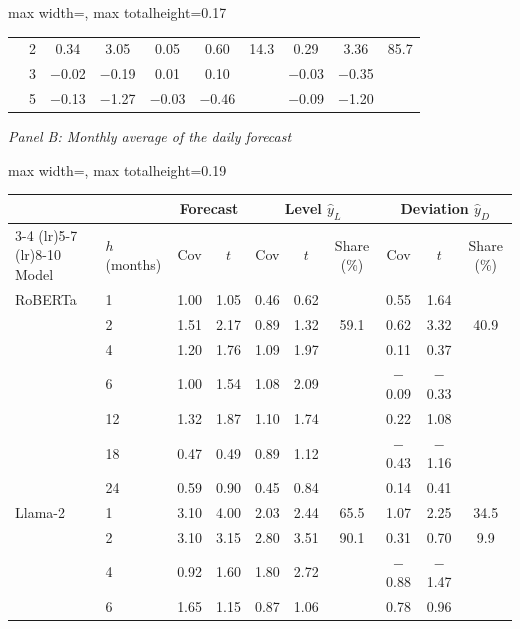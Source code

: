 \begin{table}[htbp]
{\begin{adjustbox}{max width=\linewidth, max totalheight=0.17\textheight}
\begin{tabular}{llcccccccc}
 & 2 & \phantom{$-$}0.34 & \phantom{$-$0}3.05 & \phantom{$-$}0.05 & \phantom{$-$}0.60 & \phantom{$-$}14.3 & \phantom{$-$}0.29 & \phantom{$-$0}3.36 & \phantom{0}85.7 \\
 & 3 & $-$0.02 & \phantom{0}$-$0.19 & \phantom{$-$}0.01 & \phantom{$-$}0.10 &  & $-$0.03 & \phantom{0}$-$0.35 &  \\
 & 5 & $-$0.13 & \phantom{0}$-$1.27 & $-$0.03 & $-$0.46 &  & $-$0.09 & \phantom{0}$-$1.20 &  \\
\bottomrule
\end{tabular}
\end{adjustbox}
\par\medskip
\textit{Panel B: Monthly average of the daily forecast}\\[2pt]
\begin{adjustbox}{max width=\linewidth, max totalheight=0.19\textheight}
\begin{tabular}{llcccccccc}
\toprule
\multicolumn{2}{c}{} & \multicolumn{2}{c}{Forecast} & \multicolumn{3}{c}{Level $\hat y_L$} & \multicolumn{3}{c}{Deviation $\hat y_D$} \\
\cmidrule(lr){3-4} \cmidrule(lr){5-7} \cmidrule(lr){8-10}
Model & $h$ (months) & Cov & $t$ & Cov & $t$ & Share (\%) & Cov & $t$ & Share (\%) \\
\midrule
RoBERTa & 1 & 1.00 & 1.05 & 0.46 & 0.62 &  & \phantom{$-$}0.55 & \phantom{$-$}1.64 &  \\
 & 2 & 1.51 & 2.17 & 0.89 & 1.32 & 59.1 & \phantom{$-$}0.62 & \phantom{$-$}3.32 & 40.9 \\
 & 4 & 1.20 & 1.76 & 1.09 & 1.97 &  & \phantom{$-$}0.11 & \phantom{$-$}0.37 &  \\
 & 6 & 1.00 & 1.54 & 1.08 & 2.09 &  & $-$0.09 & $-$0.33 &  \\
 & 12 & 1.32 & 1.87 & 1.10 & 1.74 &  & \phantom{$-$}0.22 & \phantom{$-$}1.08 &  \\
 & 18 & 0.47 & 0.49 & 0.89 & 1.12 &  & $-$0.43 & $-$1.16 &  \\
 & 24 & 0.59 & 0.90 & 0.45 & 0.84 &  & \phantom{$-$}0.14 & \phantom{$-$}0.41 &  \\
\midrule
Llama-2 & 1 & 3.10 & 4.00 & 2.03 & 2.44 & 65.5 & \phantom{$-$}1.07 & \phantom{$-$}2.25 & 34.5 \\
 & 2 & 3.10 & 3.15 & 2.80 & 3.51 & 90.1 & \phantom{$-$}0.31 & \phantom{$-$}0.70 & \phantom{0}9.9 \\
 & 4 & 0.92 & 1.60 & 1.80 & 2.72 &  & $-$0.88 & $-$1.47 &  \\
 & 6 & 1.65 & 1.15 & 0.87 & 1.06 &  & \phantom{$-$}0.78 & \phantom{$-$}0.96 &  \\

\end{tabular}
\end{adjustbox}}
\end{table}
